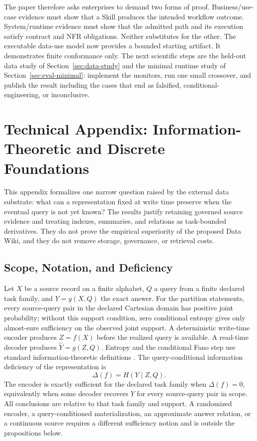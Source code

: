 \documentclass[11pt]{article}
\begin{document}
The paper therefore asks enterprises to demand two forms of proof. Business/use-case evidence must show that a Skill produces the intended workflow outcome. System/runtime evidence must show that the admitted path and its execution satisfy contract and NFR obligations. Neither substitutes for the other. The executable data-use model now provides a bounded starting artifact. It demonstrates finite conformance only. The next scientific steps are the held-out data study of Section~\ref{sec:data-study} and the minimal runtime study of Section~\ref{sec:eval-minimal}: implement the monitors, run one small crossover, and publish the result including the cases that end as falsified, conditional-engineering, or inconclusive.

\section{Technical Appendix: Information-Theoretic and Discrete Foundations}
\label{sec:formal-data-foundations}

This appendix formalizes one narrow question raised by the external data substrate: what can a representation fixed at write time preserve when the eventual query is not yet known? The results justify retaining governed source evidence and treating indexes, summaries, and relations as task-bounded derivatives. They do not prove the empirical superiority of the proposed Data Wiki, and they do not remove storage, governance, or retrieval costs.

\subsection{Scope, Notation, and Deficiency}

Let $X$ be a source record on a finite alphabet, $Q$ a query from a finite declared task family, and $Y=y(X,Q)$ the exact answer. For the partition statements, every source-query pair in the declared Cartesian domain has positive joint probability; without this support condition, zero conditional entropy gives only almost-sure sufficiency on the observed joint support. A deterministic write-time encoder produces $Z=f(X)$ before the realized query is available. A read-time decoder produces $\widehat{Y}=g(Z,Q)$. Entropy and the conditional Fano step use standard information-theoretic definitions \cite{cover2006elements}. The query-conditional information deficiency of the representation is
\begin{equation}
\Delta(f)=H(Y\mid Z,Q).
\end{equation}
The encoder is exactly sufficient for the declared task family when $\Delta(f)=0$, equivalently when some decoder recovers $Y$ for every source-query pair in scope. All conclusions are relative to that task family and support. A randomized encoder, a query-conditioned materialization, an approximate answer relation, or a continuous source requires a different sufficiency notion and is outside the propositions below.
\end{document}
